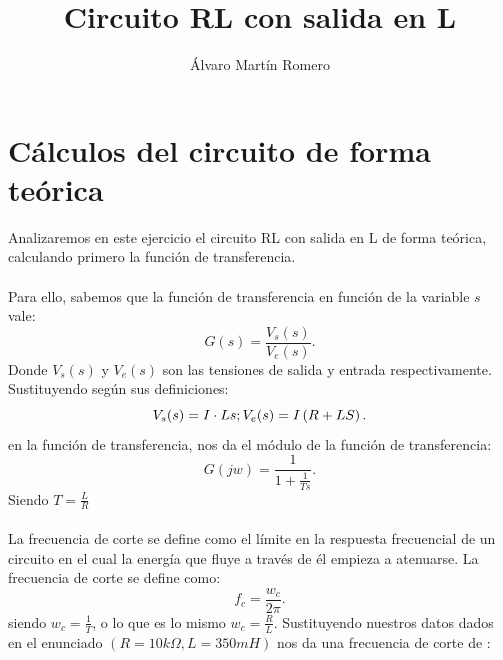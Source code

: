 \documentclass[11pt,letterpaper]{article}
\title{Circuito RL con salida en L}
\author{Álvaro Martín Romero}
\begin{document}
\maketitle
\section{Cálculos del circuito de forma teórica}%
\label{sec:Ejercicio 1}
Analizaremos en este ejercicio el circuito RL con salida en L de forma teórica, calculando primero la función de transferencia.\\
\\
Para ello, sabemos que la función de transferencia en función de la variable $s$ vale:
\[
	G(s)=\frac{V_s(s)}{V_e(s)}
.\] 
Donde $V_s(s)$ y $V_e(s)$ son las tensiones de salida y entrada respectivamente. Sustituyendo según sus definiciones:
\[
	V_s(s)=I\cdot Ls; \\ \\ \\ \\  \\ V_e(s)=I\left( R+LS \right) 
.\] 
en la función de transferencia, nos da el módulo de la función de transferencia:
\[
	G(jw)=\frac{1}{1+ \frac{1}{Ts}}
.\] 
Siendo $T=\frac{L}{R}$ \\
\\

La frecuencia de corte se define como el límite en la respuesta frecuencial de un circuito en el cual la energía que fluye a través de él empieza a atenuarse. La frecuencia de corte se define como:
\[
f_c=\frac{w_c}{2\pi}
.\] 
siendo $w_c= \frac{1}{T}$, o lo que es lo mismo $w_c=\frac{R}{L}$. Sustituyendo nuestros datos dados en el enunciado $\left( R=10 k\Omega, L=350mH \right) $ nos da una frecuencia de corte de :
\end{document}
